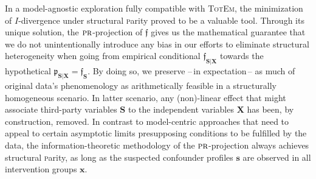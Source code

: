 \documentclass[10pt]{article}
\newcommand{\totem}{\textsc{Tot}\textsc{Em}\xspace}
\newcommand{\prob}[1]{\mathfrak{#1}}
\begin{document}
In a model-agnostic exploration fully compatible with \totem, the minimization of $I$-divergence  under structural \textsc{p}arity proved to be a valuable tool. 
Through its unique solution, the $\textsc{pr}$-projection of $\prob f$  gives us the mathematical guarantee  that we do not unintentionally introduce any bias in our efforts to eliminate structural heterogeneity when going from empirical conditional $\prob f_{\boldsymbol S\vert\boldsymbol X}$ towards the hypothetical $\prob p_{\boldsymbol S\vert\boldsymbol X}=\prob f_{\boldsymbol S}$.
By doing so, we preserve --\,in expectation\,-- as much of original data's phenomenology as arithmetically feasible in a structurally homogeneous scenario. 
In latter scenario, any (non)-linear effect that might associate 
third-party variables 
 $\boldsymbol S$ to the  {independent} variables $\boldsymbol X$ has been, by construction, removed. 
In contrast to model-centric approaches that need to appeal to certain asymptotic limits presupposing conditions to be fulfilled by the data, the  information-theoretic methodology of the $\textsc{pr}$-projection always achieves structural \textsc{p}arity, as long as the suspected confounder profiles $\boldsymbol s$ are observed in all intervention groups $\boldsymbol x$.
\end{document}
